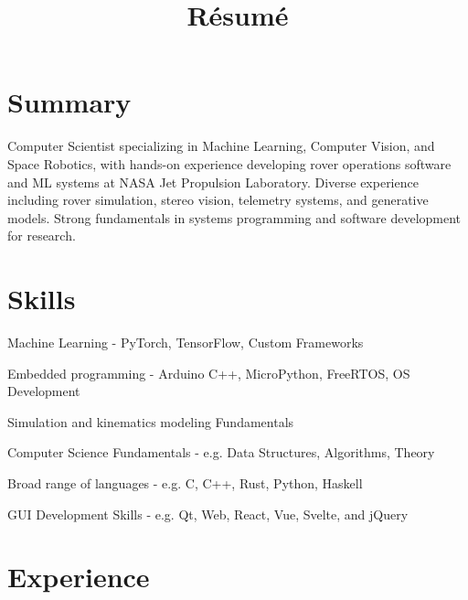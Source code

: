 \documentclass[a4paper, extended]{comcv}
\title{\comcv@firstname{} \comcv@lastname{} Résumé}
\begin{document}
\section{Summary}

Computer Scientist specializing in Machine Learning, Computer Vision, and Space
Robotics, with hands-on experience developing rover operations software and ML
systems at NASA Jet Propulsion Laboratory. Diverse experience including rover
simulation, stereo vision, telemetry systems, and generative models. Strong
fundamentals in systems programming and software development for research.

\section{Skills}

\begin{tightitemize}
  \item Machine Learning - PyTorch, TensorFlow, Custom Frameworks
  \item Embedded programming - Arduino C++, MicroPython, FreeRTOS, OS Development
  \item Simulation and kinematics modeling Fundamentals
  \item Computer Science Fundamentals - e.g. Data Structures, Algorithms, Theory
  \item Broad range of languages - e.g. C, C++, Rust, Python, Haskell
  \item GUI Development Skills - e.g. Qt, Web, React, Vue, Svelte, and jQuery
\end{tightitemize}

\section{Experience}


\end{document}
